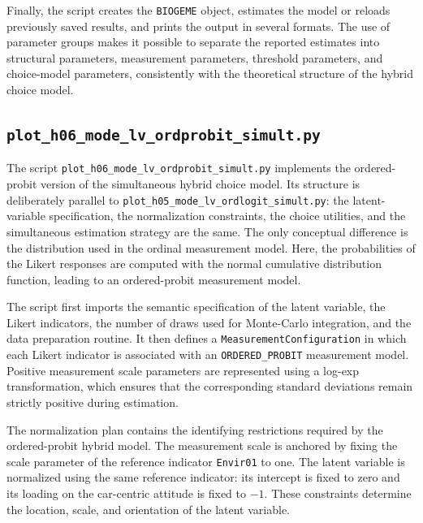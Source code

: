 \documentclass[12pt,a4paper]{article}
\begin{document}
Finally, the script creates the \lstinline$BIOGEME$ object, estimates
the model or reloads previously saved results, and prints the output
in several formats. The use of parameter groups makes it possible to
separate the reported estimates into structural parameters,
measurement parameters, threshold parameters, and choice-model
parameters, consistently with the theoretical structure of the hybrid
choice model.

\subsection{\lstinline$plot_h06_mode_lv_ordprobit_simult.py$}
\label{sec:plot_h06_mode_lv_ordprobit_simult.py}


The script \lstinline$plot_h06_mode_lv_ordprobit_simult.py$
implements the ordered-probit version of the simultaneous hybrid
choice model. Its structure is deliberately parallel to
\lstinline$plot_h05_mode_lv_ordlogit_simult.py$: the latent-variable
specification, the normalization constraints, the choice utilities,
and the simultaneous estimation strategy are the same. The only
conceptual difference is the distribution used in the ordinal
measurement model. Here, the probabilities of the Likert responses are
computed with the normal cumulative distribution function, leading to
an ordered-probit measurement model.

The script first imports the semantic specification of the latent
variable, the Likert indicators, the number of draws used for
Monte-Carlo integration, and the data preparation routine. It then
defines a \lstinline$MeasurementConfiguration$ in which each Likert
indicator is associated with an
\lstinline$ORDERED_PROBIT$ measurement model. Positive measurement
scale parameters are represented using a log-exp transformation, which
ensures that the corresponding standard deviations remain strictly
positive during estimation.

The normalization plan contains the identifying restrictions required
by the ordered-probit hybrid model. The measurement scale is anchored
by fixing the scale parameter of the reference indicator
\lstinline$Envir01$ to one. The latent variable is normalized using
the same reference indicator: its intercept is fixed to zero and its
loading on the car-centric attitude is fixed to \(-1\). These
constraints determine the location, scale, and orientation of the
latent variable.
\end{document}

